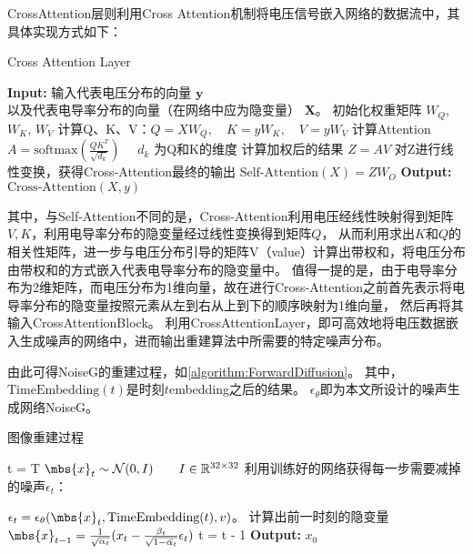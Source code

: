 CrossAttention层则利用Cross Attention机制将电压信号嵌入网络的数据流中，其具体实现方式如下：

\begin{algorithm}[h]
    
    \caption{Cross Attention Layer}
    \begin{algorithmic}[1]
        \State \textbf{Input:} 输入代表电压分布的向量 $\boldsymbol{y}$\\
        以及代表电导率分布的向量（在网络中应为隐变量） $\boldsymbol{X}$。
        \State 初始化权重矩阵 $W_Q$, $W_K$, $W_V$
        \State 计算Q、K、V：$Q = XW_Q, \quad K = yW_K, \quad V = yW_V$
        \State 计算Attention  $A = \text{softmax}\left(\frac{QK^T}{\sqrt{d_k}}\right) \quad $ $d_k$ 为Q和K的维度 
        \State 计算加权后的结果 $Z = AV$
        \State 对Z进行线性变换，获得Cross-Attention最终的输出  $\text{Self-Attention}(X) = ZW_O$
        \State \textbf{Output:} $\text{Cross-Attention}(X, y)$
    \end{algorithmic}
    \label{algorithm:CrossAttention}
\end{algorithm}

其中，与Self-Attention不同的是，Cross-Attention利用电压经线性映射得到矩阵$V, K$，利用电导率分布的隐变量经过线性变换得到矩阵$Q$，
从而利用求出$K$和$Q$的相关性矩阵，进一步与电压分布引导的矩阵V（value）计算出带权和，将电压分布由带权和的方式嵌入代表电导率分布的隐变量中。
值得一提的是，由于电导率分布为2维矩阵，而电压分布为1维向量，故在进行Cross-Attention之前首先表示将电导率分布的隐变量按照元素从左到右从上到下的顺序映射为1维向量，
然后再将其输入CrossAttentionBlock。
利用CrossAttentionLayer，即可高效地将电压数据嵌入生成噪声的网络中，进而输出重建算法中所需要的特定噪声分布。

由此可得NoiseG的重建过程，如\cref{algorithm:ForwardDiffusion}。
其中，$\text{TimeEmbedding}(t)$是时刻$t$embedding之后的结果。
$\epsilon_\theta$即为本文所设计的噪声生成网络NoiseG。
\begin{algorithm}[H]
    
    \caption{图像重建过程}
    \begin{algorithmic}[1]

        \State t = T
        \State $\mbs{x}_t \sim \mathcal{N}(0, I) \qquad I \in \mathbb{R}^{32 \times 32}$
        \State 利用训练好的网络获得每一步需要减掉的噪声$\epsilon_t$：
        
        $\epsilon_t = \epsilon_\theta(\mbs{x}_t, \text{TimeEmbedding}(t), v)$。
        \State 计算出前一时刻的隐变量$\mbs{x}_{t-1} = \frac{1}{\sqrt{\alpha_t}}(x_t - \frac{\beta_t}{\sqrt{1-\hat{\alpha_t}}}\epsilon_t)$
        \State t = t - 1
        \EndWhile
        \State \textbf{Output:} $x_0$
    \end{algorithmic}
    \label{algorithm:ForwardDiffusion}
\end{algorithm}

